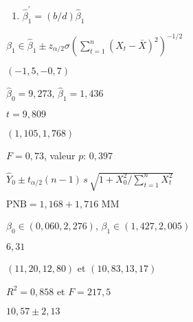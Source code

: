\begin{reponse}{2.9}
    \begin{enumerate}
    \item $\hat{\beta}_1^\prime = (b/d) \hat{\beta}_1$
    \end{enumerate}
  
\end{reponse}
\begin{reponse}{2.11}
    $\beta_1 \in \hat{\beta}_1 \pm z_{\alpha/2} \sigma
    \left( \sum_{t=1}^n (X_t - \bar{X})^2 \right)^{-1/2}$
  
\end{reponse}
\begin{reponse}{2.12}
    $(-1,5, -0,7)$
  
\end{reponse}
\begin{reponse}{2.13}
    \begin{inparaenum}
    \item $\hat{\beta}_0 = 9,273$, $\hat{\beta}_1 = 1,436$
    \item $t = 9,809$
    \item $(1,105, 1,768)$
    \end{inparaenum}
  
\end{reponse}
\begin{reponse}{2.14}
    $F = 0,73$, valeur $p$: $0,397$
  
\end{reponse}
\begin{reponse}{2.15}
    $\hat{Y}_0 \pm t_{\alpha/2}(n - 1)\, s\,
    \sqrt{1 + X_0^2/\sum_{t=1}^n X_t^2}$
  
\end{reponse}
\begin{reponse}{2.16}
    \begin{inparaenum}
    \item $\text{PNB} = 1,168 + 1,716 \text{ MM}$
    \item $\beta_0 \in (0,060, 2,276)$, $\beta_1 \in (1,427, 2,005)$
    \item $6,31$
    \item $(11,20, 12,80)$ et $(10,83, 13,17)$
    \end{inparaenum}
  
\end{reponse}
\begin{reponse}{2.18}
    \begin{inparaenum}
    \item $R^2 = 0,858$ et
      $F = 217,5$
    \item $10,57 \pm
      2,13$
    \end{inparaenum}
  
\end{reponse}
